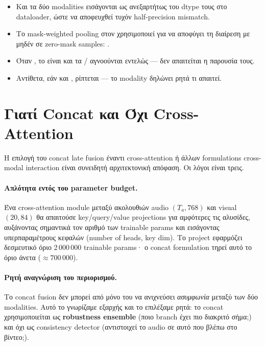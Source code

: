 \begin{itemize}
  \item Και τα δύο modalities εισάγονται ως 
        ανεξαρτήτως του dtype τους στο dataloader,
        ώστε να αποφευχθεί τυχόν half-precision mismatch.
  \item Το mask-weighted pooling στον 
        χρησιμοποιεί 
        για να αποφύγει τη διαίρεση με μηδέν σε zero-mask samples:
        .
  \item Όταν , το  είναι 
        και τα  /  αγνοούνται εντελώς —
        δεν απαιτείται η παρουσία τους.
  \item Αντίθετα, εάν  και ,
        ρίπτεται  —
        το modality δηλώνει ρητά τι απαιτεί.
\end{itemize}

\section{Γιατί Concat και Όχι Cross-Attention}
\label{sec:why-concat}

Η επιλογή του concat late fusion έναντι cross-attention
ή άλλων formulations cross-modal interaction
είναι συνειδητή αρχιτεκτονική απόφαση.
Οι λόγοι είναι τρεις.

\paragraph{Απλότητα εντός του parameter budget.}
Ένα cross-attention module μεταξύ ακολουθιών audio $(T_a, 768)$
και visual $(20, 84)$ θα απαιτούσε key/query/value projections
για αμφότερες τις αλυσίδες,
αυξάνοντας σημαντικά τον αριθμό των trainable params
και εισάγοντας υπερπαραμέτρους κεφαλών (number of heads, key dim).
Το project εφαρμόζει δεσμευτικό όριο 2\,000\,000 trainable params·
ο concat formulation τηρεί αυτό το όριο άνετα (${\approx}700\,000$).

\paragraph{Ρητή αναγνώριση του περιορισμού.}
Το concat fusion δεν μπορεί από μόνο του να ανιχνεύσει
\emph{ασυμφωνία} μεταξύ των δύο modalities.
Αυτό το γνωρίζαμε εξαρχής και το επιλέξαμε ρητά:
το concat χρησιμοποιείται ως \textbf{robustness ensemble}
(ποιο branch έχει πιο διακριτό σήμα;)
και όχι ως consistency detector
(αντιστοιχεί το audio σε αυτό που βλέπω στο βίντεο;).

